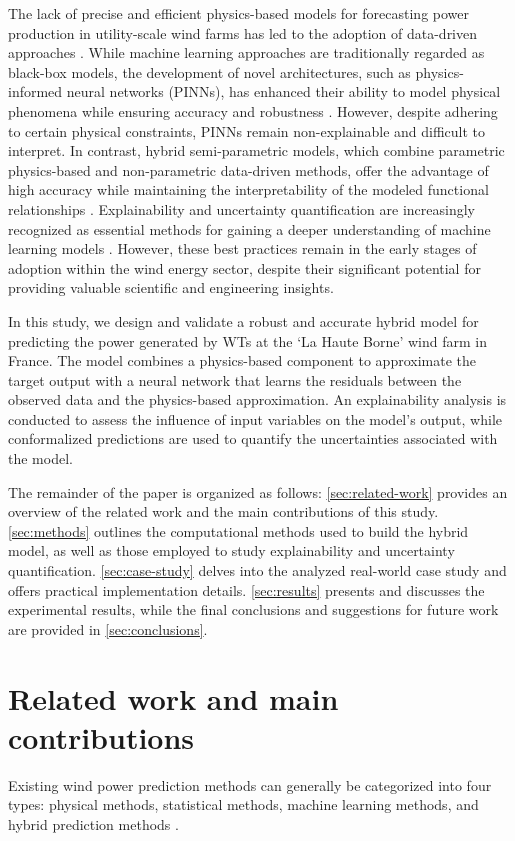 \documentclass[preprint,12pt]{elsarticle}
\begin{document}
The lack of precise and efficient physics-based models for forecasting power production in utility-scale wind farms has led to the adoption of data-driven approaches \cite{Pujana2023}. While machine learning approaches are traditionally regarded as black-box models, the development of novel architectures, such as physics-informed neural networks (PINNs), has enhanced their ability to model physical phenomena while ensuring accuracy and robustness \cite{Fernandez2023}. However, despite adhering to certain physical constraints, PINNs remain non-explainable and difficult to interpret. In contrast, hybrid semi-parametric models, which combine parametric physics-based and non-parametric data-driven methods, offer the advantage of high accuracy while maintaining the interpretability of the modeled functional relationships \cite{VONSTOSCH2014}. Explainability and uncertainty quantification are increasingly recognized as essential methods for gaining a deeper understanding of machine learning models \cite{Roscher2020,Abdar2021}. However, these best practices remain in the early stages of adoption within the wind energy sector, despite their significant potential for providing valuable scientific and engineering insights.

In this study, we design and validate a robust and accurate hybrid model for predicting the power generated by WTs at the `La Haute Borne' wind farm in France. The model combines a physics-based component to approximate the target output with a neural network that learns the residuals between the observed data and the physics-based approximation. An explainability analysis is conducted to assess the influence of input variables on the model's output, while conformalized predictions are used to quantify the uncertainties associated with the model.

The remainder of the paper is organized as follows: \autoref{sec:related-work} provides an overview of the related work and the main contributions of this study. \autoref{sec:methods} outlines the computational methods used to build the hybrid model, as well as those employed to study explainability and uncertainty quantification. \autoref{sec:case-study} delves into the analyzed real-world case study and offers practical implementation details. \autoref{sec:results} presents and discusses the experimental results, while the final conclusions and suggestions for future work are provided in \autoref{sec:conclusions}.

\section{Related work and main contributions}\label{sec:related-work}
Existing wind power prediction methods can generally be categorized into four types: physical methods, statistical methods, machine learning methods, and hybrid prediction methods \cite{CHEN2020}.
\end{document}
